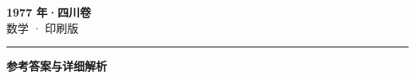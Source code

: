 \documentclass[zihao=5, a4paper]{ctexart}
\begin{document}
\begin{center}
  {\Large\bfseries 1977 年·四川卷}\\[4pt]
  {\large 数学 · 印刷版}
\end{center}
\medskip
{}

\par\bigskip\hrule\bigskip
{}
\begin{center}{\large\bfseries 参考答案与详细解析}\end{center}
\smallskip

\end{document}
